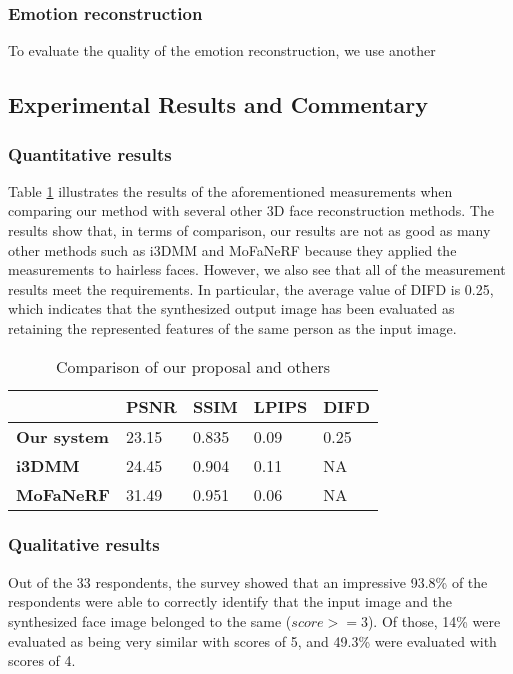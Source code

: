 \subsubsection{Emotion reconstruction}
To evaluate the quality of the emotion reconstruction, we use another


\subsection{Experimental Results and Commentary}
\subsubsection{Quantitative results}
Table \ref{loss_stats} illustrates the results of the aforementioned measurements when comparing our method with several other 3D face reconstruction methods. The results show that, in terms of comparison, our results are not as good as many other methods such as i3DMM and MoFaNeRF because they applied the measurements to hairless faces. However, we also see that all of the measurement results meet the requirements. In particular, the average value of DIFD is 0.25, which indicates that the synthesized output image has been evaluated as retaining the represented features of the same person as the input image.

\begin{table}[H]
    \centering
    \captionsetup{font=bf}
    \caption{Comparison of our proposal and others}
    \begin{tabularx}{\linewidth}{| X | X | X | X | X |}
        \hline
                            & \textbf{PSNR} & \textbf{SSIM} & \textbf{LPIPS} & \textbf{DIFD} \\ \hline\hline
        \textbf{Our system} & 23.15         & 0.835         & 0.09           & 0.25          \\ \hline %
        \textbf{i3DMM}      & 24.45         & 0.904         & 0.11           & NA            \\ \hline
        \textbf{MoFaNeRF}   & 31.49         & 0.951         & 0.06           & NA            \\ \hline
    \end{tabularx}
    \label{loss_stats}
\end{table}

\subsubsection{Qualitative results}
Out of the 33 respondents, the survey showed that an impressive 93.8\% of the respondents were able to correctly identify that the input image and the synthesized face image belonged to the same  ($score >= 3$). Of those, 14\% were evaluated as being very similar with scores of 5, and 49.3\% were evaluated with scores of 4. %

